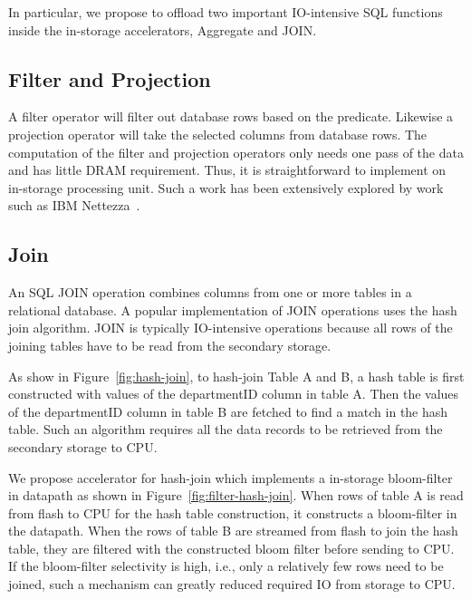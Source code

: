 \documentclass{article}
\begin{document}
In particular, we propose to offload two important IO-intensive SQL functions inside the in-storage accelerators, Aggregate and JOIN.


\subsection{Filter and Projection}

A filter operator will filter out database rows based on the predicate.
Likewise a projection operator will take the selected columns from database rows.
The computation of the filter and projection operators only needs one pass of the data and has little DRAM requirement.
Thus, it is straightforward to implement on in-storage processing unit.
Such a work has been extensively explored by work such as IBM Nettezza~\cite{netezza}.

\subsection{Join}

An SQL JOIN operation combines columns from one or more tables in a relational database.
A popular implementation of JOIN operations uses the hash join algorithm.
JOIN is typically IO-intensive operations because all rows of the joining tables have to be read from the secondary storage.

As show in Figure~\ref{fig:hash-join}, to hash-join Table A and B, a hash table is first constructed with values of the departmentID column in table A.
Then the values of the departmentID column in table B are fetched to find a match in the hash table.
Such an algorithm requires all the data records to be retrieved from the secondary storage to CPU.

We propose accelerator for hash-join which implements a in-storage bloom-filter in datapath as shown in Figure~\ref{fig:filter-hash-join}.
When rows of table A is read from flash to CPU for the hash table construction, it constructs a bloom-filter in the datapath.
When the rows of table B are streamed from flash to join the hash table, they are filtered with the constructed bloom filter before sending to CPU.
If the bloom-filter selectivity is high, i.e., only a relatively few rows need to be joined, such a mechanism can greatly reduced required IO from storage to CPU.
\end{document}
